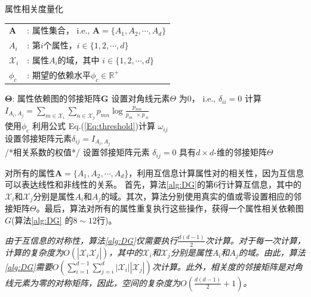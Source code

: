 \begin{algorithm}[htb]
 \small
\caption{属性相关度量化}
\label{alg:DG}
\begin{algorithmic}[1]
\REQUIRE
\begin{tabular}[t]{p{3mm}l}
 $\bm{A}$&: 属性集合， i.e., $\bm{A}=\{A_1,A_2,\cdots,A_d\}$\\
 $A_{i}$&: 第$i$个属性，$i\in\{1,2,\cdots,d\}$\\
 $\mathcal{X}_i$&: 属性$A_i$的域，其中 $i\in\{1,2,\cdots,d\}$\\
 $\phi_{c}$&: 期望的依赖水平$\phi_{c} \in \mathbb{R}^{+}$
\end{tabular}
\ENSURE $\bm{\Theta}$: 属性依赖图的邻接矩阵$\mathbf{G}$
\STATE 设置对角线元素$\Theta$ 为$0$， i.e., $\delta_{ii}=0$
\ENDFOR
{}
\STATE 计算 $I_{A_{i},A_{j}}=\sum_{m\in \mathcal{X}_{i}}\sum_{n\in\mathcal{X}_{j}}p_{mn}\log \frac{p_{mn}}{p_{m\cdot}\times p_{\cdot n}}$\\
\STATE 使用$\phi_{c}$ 利用公式 Eq.(\ref{Eq:threshold})计算 $\omega_{ij}$ \\
\STATE 设置邻接矩阵元素$\delta_{ij}=I_{A_{i},A_{j}}$ \\ /*相关系数的权值*/
\ELSE
\STATE 设置邻接矩阵元素 $\delta_{ij}=0$
\ENDIF
\ENDFOR
\ENDFOR
\RETURN 具有$d \times d$-维的邻接矩阵$\Theta$
\end{algorithmic}
\end{algorithm}


对所有的属性$\bm{A}=\{A_1,A_2,\cdots,A_d\}$，利用互信息计算属性对的相关性，因为互信息可以表达线性和非线性的关系\cite{reshef2011detecting}。 首先，算法\ref{alg:DG}的第$6$行计算互信息，其中的$\mathcal{X}_i$和$\mathcal{X}_j$分别是属性$A_i$和$A_j$的域。其次，算法分别使用真实的值或零设置相应的邻接矩阵$\Theta$。最后，算法对所有的属性重复执行这些操作，获得一个属性相关依赖图$G$(算法\ref{alg:DG} 的$8 \sim 12$行)。

\begin{remark}{\em
由于互信息的对称性，算法\textup{\ref{alg:DG}}仅需要执行$\frac{d(d-1)}{2}$次计算。对于每一次计算，计算的复杂度为$O(|\mathcal{X}_i \mathcal{X}_j|)$，其中的$\mathcal{X}_i$和$\mathcal{X}_j$分别是属性$A_i$和$A_j$的域。由此，算法\textup{\ref{alg:DG}}需要$O(\sum_{i=1}^{d-1}\sum_{j=i}^{d}|\mathcal{X}_i||\mathcal{X}_j|)$次计算。此外，相关度的邻接矩阵是对角线元素为零的对称矩阵，因此，空间的复杂度为$O(\frac{d(d-1)}{2}+1)$。
}

\end{remark}

